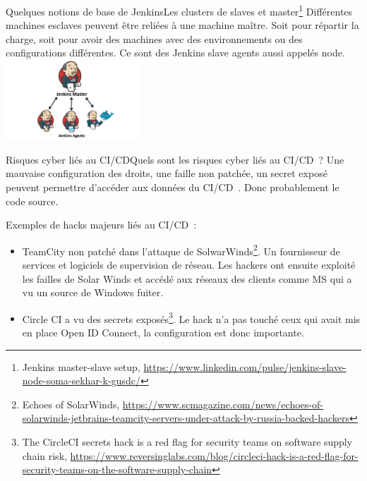 \documentclass{beamer}
\begin{document}
    \begin{frame}{Quelques notions de base de Jenkins}{Les clusters de slaves et master\footnote{Jenkins master-slave setup, \url{https://www.linkedin.com/pulse/jenkins-slave-node-soma-sekhar-k-gusdc/}}}
        \transdissolve
        Différentes machines esclaves peuvent être reliées à une machine maître.
        Soit pour répartir la charge, soit pour avoir des machines avec des environnements ou des configurations différentes.
        Ce sont des Jenkins slave agents aussi appelés node.
        \bigbreak
        \centering
        \includegraphics[width=5cm]{image/jenkins-cluster}
    \end{frame}

    \begin{frame}{Risques cyber liés au CI/CD}{Quels sont les risques cyber liés au CI/CD~?}
        \transdissolve
        \pause
        Une mauvaise configuration des droits, une faille non patchée, un secret exposé peuvent permettre d'accéder aux données du CI/CD~.
        Donc probablement le code source.

        Exemples de hacks majeurs liés au CI/CD~:
        \begin{itemize}
            \item TeamCity non patché dans l'attaque de SolwarWinds\footnote{Echoes of SolarWinds, \url{https://www.scmagazine.com/news/echoes-of-solarwinds-jetbrains-teamcity-servers-under-attack-by-russia-backed-hackers}}.
            Un fournisseur de services et logiciels de supervision de réseau.
            Les hackers ont ensuite exploité les failles de Solar Winds et accédé aux réseaux des clients comme MS qui a vu un source de Windows fuiter.
            \item Circle CI a vu des secrets exposés\footnote{The CircleCI secrets hack is a red flag for security teams on software supply chain risk, \url{https://www.reversinglabs.com/blog/circleci-hack-is-a-red-flag-for-security-teams-on-the-software-supply-chain}}.
            Le hack n'a pas touché ceux qui avait mis en place Open ID Connect, la configuration est donc importante.
        \end{itemize}
    \end{frame}
\end{document}
